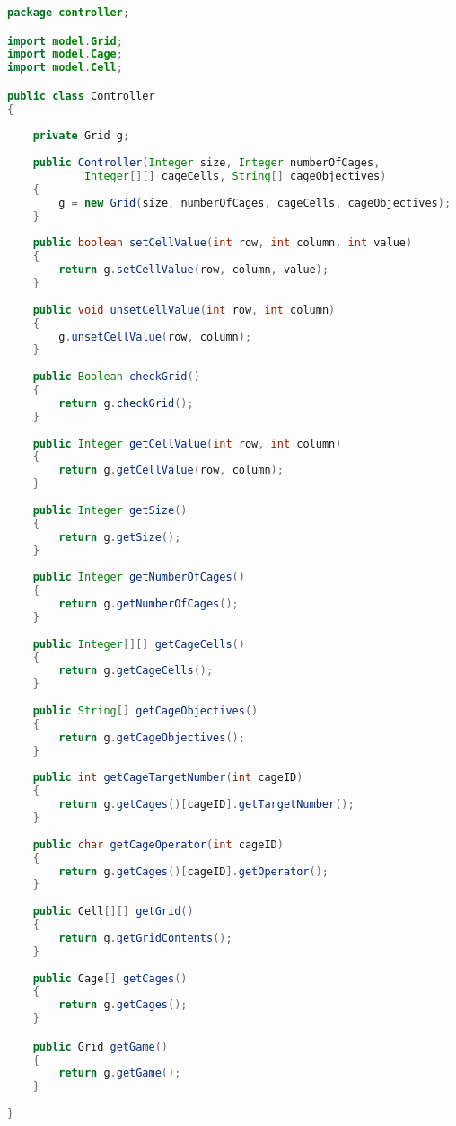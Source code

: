 \begin{lstlisting}[language=Java,basicstyle=\tiny,caption=Controller.java]
package controller;

import model.Grid;
import model.Cage;
import model.Cell;

public class Controller
{
    
    private Grid g;
    
    public Controller(Integer size, Integer numberOfCages, 
            Integer[][] cageCells, String[] cageObjectives)
    {
        g = new Grid(size, numberOfCages, cageCells, cageObjectives);
    }
    
    public boolean setCellValue(int row, int column, int value)
    {
        return g.setCellValue(row, column, value);
    }
    
    public void unsetCellValue(int row, int column)
    {
        g.unsetCellValue(row, column);
    }
    
    public Boolean checkGrid()
    {
        return g.checkGrid();
    }
    
    public Integer getCellValue(int row, int column)
    {
        return g.getCellValue(row, column);
    }
    
    public Integer getSize()
    {
        return g.getSize();
    }
    
    public Integer getNumberOfCages()
    {
        return g.getNumberOfCages();
    }
    
    public Integer[][] getCageCells()
    {
        return g.getCageCells();
    } 
    
    public String[] getCageObjectives()
    {
        return g.getCageObjectives();
    }
    
    public int getCageTargetNumber(int cageID)
    {
        return g.getCages()[cageID].getTargetNumber();
    }
    
    public char getCageOperator(int cageID)
    {
        return g.getCages()[cageID].getOperator();
    }
    
    public Cell[][] getGrid()
    {
        return g.getGridContents();
    }
    
    public Cage[] getCages()
    {
        return g.getCages();
    }

    public Grid getGame()
    {
        return g.getGame();
    }
    
}
\end{lstlisting}


